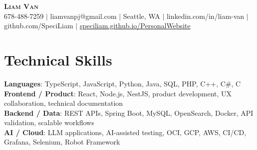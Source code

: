 \documentclass[letterpaper,11pt]{article}
\begin{document}

%
\begin{center}
    \textbf{\Huge \scshape Liam Van} \\ \vspace{1pt}
    \small 678-488-7259 $|$ \small {liamvanpj@gmail.com} $|$ Seattle, WA
 {{$|$ linkedin.com/in/liam-van} {$|$ github.com/SpeciLiam} {$|$ \href{https://speciliam.github.io/PersonalWebsite}{speciliam.github.io/PersonalWebsite}}}

\end{center}

\section{Technical Skills}
 \begin{itemize}[leftmargin=0.15in, label={}]
    \small{\item{
     \textbf{Languages}{: TypeScript, JavaScript, Python, Java, SQL, PHP, C++, C\#, C} \\
     \textbf{Frontend / Product}{: React, Node.js, NestJS, product development, UX collaboration, technical documentation} \\
     \textbf{Backend / Data}{: REST APIs, Spring Boot, MySQL, OpenSearch, Docker, API validation, scalable workflows} \\
     \textbf{AI / Cloud}{: LLM applications, AI-assisted testing, OCI, GCP, AWS, CI/CD, Grafana, Selenium, Robot Framework} \\
    }}
 \end{itemize}
%
\end{document}
